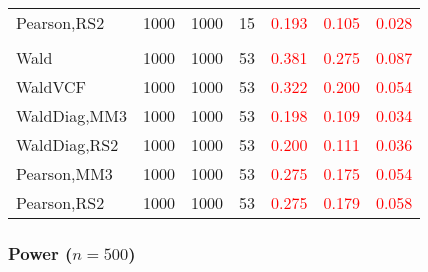 \documentclass[
]{article}
\begin{document}
\begin{table}[H]
{\begin{tabular}[t]{lrrrrrr}
\hspace{1em}Pearson,RS2 & 1000 & 1000 & 15 & \textcolor{red}{0.193} & \textcolor{red}{0.105} & \textcolor{red}{0.028}\\
\addlinespace[0.3em]
\multicolumn{7}{l}{\textbf{3F 15V}}\\
\hspace{1em}Wald & 1000 & 1000 & 53 & \textcolor{red}{0.381} & \textcolor{red}{0.275} & \textcolor{red}{0.087}\\
\hspace{1em}WaldVCF & 1000 & 1000 & 53 & \textcolor{red}{0.322} & \textcolor{red}{0.200} & \textcolor{red}{0.054}\\
\hspace{1em}WaldDiag,MM3 & 1000 & 1000 & 53 & \textcolor{red}{0.198} & \textcolor{red}{0.109} & \textcolor{red}{0.034}\\
\hspace{1em}WaldDiag,RS2 & 1000 & 1000 & 53 & \textcolor{red}{0.200} & \textcolor{red}{0.111} & \textcolor{red}{0.036}\\
\hspace{1em}Pearson,MM3 & 1000 & 1000 & 53 & \textcolor{red}{0.275} & \textcolor{red}{0.175} & \textcolor{red}{0.054}\\
\hspace{1em}Pearson,RS2 & 1000 & 1000 & 53 & \textcolor{red}{0.275} & \textcolor{red}{0.179} & \textcolor{red}{0.058}\\
\bottomrule
\end{tabular}}
\endgroup{}
\end{table}

\hypertarget{power-n500-1}{%
\subsubsection{\texorpdfstring{Power
(\(n=500\))}{Power (n=500)}}\label{power-n500-1}}
\end{document}
